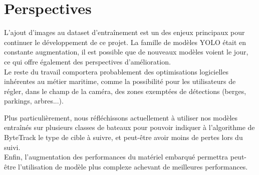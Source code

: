 \chapter{Perspectives}

L'ajout d'images au dataset d'entraînement est un des enjeux principaux 
pour continuer le développement de ce projet. 
La famille de modèles YOLO était en constante augmentation, 
il est possible que de nouveaux modèles voient le jour, 
ce qui offre également des perspectives d'amélioration. \\

Le reste du travail comportera probablement des optimisations 
logicielles inhérentes au métier maritime, comme la possibilité 
pour les utilisateurs de régler, dans le champ de la caméra,
des zones exemptées de détections (berges, parkings, arbres...). 

Plus particulièrement, nous réfléchissons actuellement à utiliser nos 
modèles entraînés sur plusieurs classes de bateaux pour pouvoir indiquer 
à l'algorithme de ByteTrack le type de cible à suivre, et peut-être 
avoir moins de pertes lors du suivi.\\

Enfin, l'augmentation des performances du matériel embarqué 
permettra peut-être l'utilisation de modèle plus complexe 
achevant de meilleures performances. \\